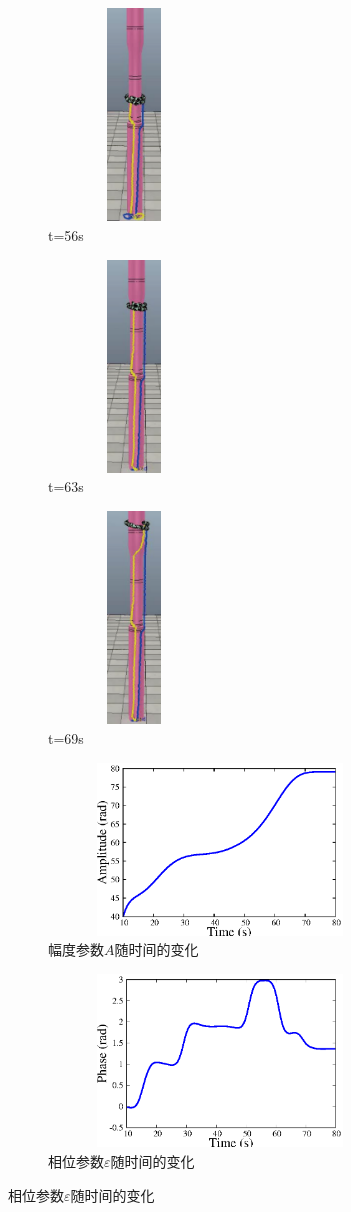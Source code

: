 \begin{figure}[htbp]
\begin{subfigure}{0.3\textwidth}{
			\centering
			\includegraphics[height=160pt,width=0.5\textwidth]{figure/chap05/BSB/1m17s.eps}
			\caption{t=56s}
		}
	\end{subfigure}
	\begin{subfigure}{0.3\textwidth}{
			\centering
			\includegraphics[height=160pt,width=0.5\textwidth]{figure/chap05/BSB/1m27s.eps}
			\caption{t=63s}
		}
	\end{subfigure}
	\begin{subfigure}{0.3\textwidth}{
			\centering
			\includegraphics[height=160pt,width=0.5\textwidth]{figure/chap05/BSB/1m35s.eps}
			\caption{t=69s}
		}
	\end{subfigure}
	\begin{subfigure}{0.45\textwidth}{
			\centering
			\includegraphics[width=1\textwidth,height=130pt]{figure/chap05/BSB/a.eps}
			\caption{幅度参数$A$随时间的变化}
			\label{fig:bsa}
		}
	\end{subfigure}
	\begin{subfigure}{0.45\textwidth}{
			\centering
			\includegraphics[width=1\textwidth,height=130pt]{figure/chap05/BSB/p.eps}
			\caption{相位参数$\varepsilon$随时间的变化}
			\label{fig:bsp}
		}

\end{subfigure}
\end{figure}
